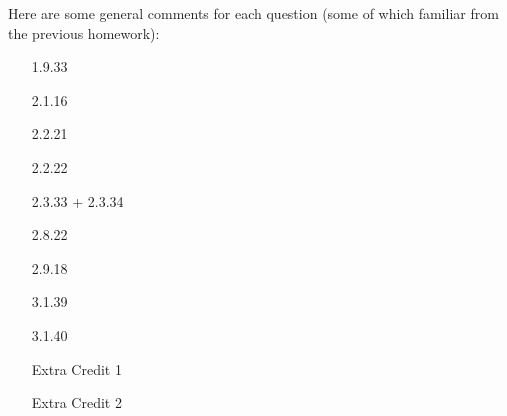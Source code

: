 \documentclass{amsart}
\theoremstyle{definition}
\theoremstyle{definition}
\DeclareMathOperator{\1}{\mathbbm{1}}
\begin{document}
Here are some general comments for each question (some of which familiar from the previous homework):

\begin{enumerate}
	\item[1.9.33]
	
	
	
	\item[2.1.16]
	
	
	
	\item[2.2.21]
	
	
	
	\item[2.2.22]
	
	
	\item[2.3.33 + 2.3.34]
	
	
	
	\item[2.8.22]
	
	
	
	
	\item[2.9.18]
	
	
	
	
	\item[3.1.39]
	
	
	
	\item[3.1.40]
	
	
	
	\item[Extra Credit 1]
	
	
	
	
	\item[Extra Credit 2]
	
\end{enumerate}


	
\end{document}
